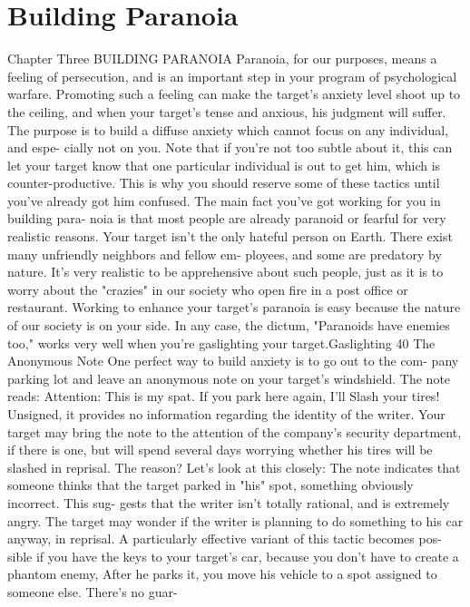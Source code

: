 \documentclass{book}
\begin{document}
\chapter{Building Paranoia}
Chapter Three 
BUILDING 
PARANOIA 
Paranoia, for our purposes, means a feeling of persecution, 
and is an important step in your program of psychological 
warfare. Promoting such a feeling can make the target's anxiety 
level shoot up to the ceiling, and when your target's tense and 
anxious, his judgment will suffer. The purpose is to build a 
diffuse anxiety which cannot focus on any individual, and espe- 
cially not on you. 
Note that if you're not too subtle about it, this can let your 
target know that one particular individual is out to get him, 
which is counter-productive. This is why you should reserve 
some of these tactics until you've already got him confused. 
The main fact you've got working for you in building para- 
noia is that most people are already paranoid or fearful for very 
realistic reasons. Your target isn't the only hateful person on 
Earth. There exist many unfriendly neighbors and fellow em- 
ployees, and some are predatory by nature. It's very realistic to 
be apprehensive about such people, just as it is to worry about 
the "crazies" in our society who open fire in a post office or 
restaurant. Working to enhance your target's paranoia is easy 
because the nature of our society is on your side. In any case, 
the dictum, "Paranoids have enemies too," works very well 
when you're gaslighting your target.Gaslighting 
40 
The Anonymous Note 
One perfect way to build anxiety is to go out to the com- 
pany parking lot and leave an anonymous note on your target's 
windshield. The note reads: 
Attention: This is my spat. If you park here again, I'll 
Slash your tires! 
Unsigned, it provides no information regarding the identity 
of the writer. Your target may bring the note to the attention of 
the company's security department, if there is one, but will 
spend several days worrying whether his tires will be slashed in 
reprisal. The reason? Let's look at this closely: 
The note indicates that someone thinks that the target 
parked in "his" spot, something obviously incorrect. This sug- 
gests that the writer isn't totally rational, and is extremely angry. 
The target may wonder if the writer is planning to do something 
to his car anyway, in reprisal. 
A particularly effective variant of this tactic becomes pos- 
sible if you have the keys to your target's car, because you don't 
have to create a phantom enemy, After he parks it, you move 
his vehicle to a spot assigned to someone else. There's no guar- 
\end{document}
